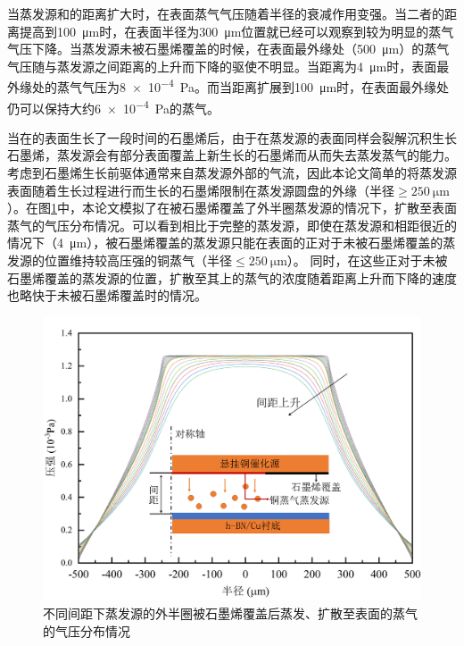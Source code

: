     当蒸发源和的距离扩大时，在表面蒸气气压随着半径的衰减作用变强。当二者的距离提高到\SI{100}{\micro\meter}时，在表面半径为\SI{300}{\micro\meter}位置就已经可以观察到较为明显的蒸气气压下降。当蒸发源未被石墨烯覆盖的时候，在表面最外缘处（\SI{500}{\micro\meter}）的蒸气气压随与蒸发源之间距离的上升而下降的驱使不明显。当距离为\SI{4}{\micro\meter}时，表面最外缘处的蒸气气压为\SI{8e-4}{\pascal}。而当距离扩展到\SI{100}{\micro\meter}时，在表面最外缘处仍可以保持大约\SI{6e-4}{\pascal}的蒸气。

    当在的表面生长了一段时间的石墨烯后，由于在蒸发源的表面同样会裂解沉积生长石墨烯，蒸发源会有部分表面覆盖上新生长的石墨烯而从而失去蒸发蒸气的能力。考虑到石墨烯生长前驱体通常来自蒸发源外部的气流，因此本论文简单的将蒸发源表面随着生长过程进行而生长的石墨烯限制在蒸发源圆盘的外缘（半径$\geqslant \SI{250}{\micro\meter}$）。在图\ref{fig:CG_FEM_halfCu}中，本论文模拟了在被石墨烯覆盖了外半圈蒸发源的情况下，扩散至表面蒸气的气压分布情况。可以看到相比于完整的蒸发源，即使在蒸发源和相距很近的情况下（\SI{4}{\micro\meter}），被石墨烯覆盖的蒸发源只能在表面的正对于未被石墨烯覆盖的蒸发源的位置维持较高压强的铜蒸气（半径$\leqslant \SI{250}{\micro\meter}$）。
    同时，在这些正对于未被石墨烯覆盖的蒸发源的位置，扩散至其上的蒸气的浓度随着距离上升而下降的速度也略快于未被石墨烯覆盖时的情况。

    \begin{figure}[htb]
        \includegraphics{pic/CG_FEM_halfCu.png}
        \caption{不同间距下蒸发源的外半圈被石墨烯覆盖后蒸发、扩散至表面的蒸气的气压分布情况}
        \label{fig:CG_FEM_halfCu}
    \end{figure}

